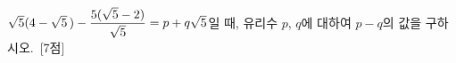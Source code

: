 $\sqrt{5}(4-\sqrt{5}\mkern3mu )-\dfrac{5(\sqrt{5}-2)}{\sqrt{5}}=p+q\sqrt{5}$일 때, 유리수 $p$, $q$에 대하여 $p-q$의 값을 구하시오.~\mbox{\mbox{[7점]}}
